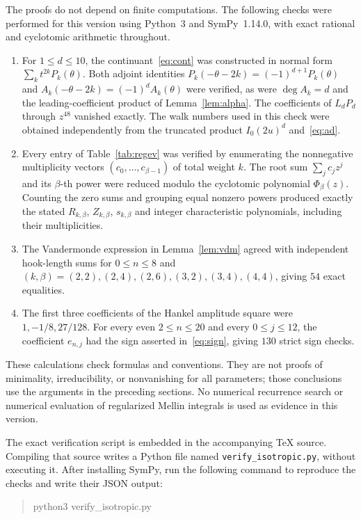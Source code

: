 \documentclass[11pt]{amsart}
\theoremstyle{definition}
\begin{document}
The proofs do not depend on finite computations. The following checks were
performed for this version using Python~3 and SymPy~1.14.0, with exact rational
and cyclotomic arithmetic throughout.

\begin{enumerate}[label=\textup{(\roman*)}]
\item For $1\le d\le10$, the continuant~\eqref{eq:cont} was constructed in
normal form $\sum_k t^{2k}P_k(\theta)$. Both adjoint identities
$P_k(-\theta-2k)=(-1)^{d+1}P_k(\theta)$ and
$A_k(-\theta-2k)=(-1)^dA_k(\theta)$ were verified, as were
$\deg A_k=d$ and the leading-coefficient product of
Lemma~\ref{lem:alpha}. The coefficients of $L_dP_d$ through $z^{48}$
vanished exactly. The walk numbers used in this check were obtained
independently from the truncated product
$I_0(2u)^d$ and~\eqref{eq:ad}.
\item Every entry of Table~\ref{tab:regev} was verified by enumerating
the nonnegative multiplicity vectors $(c_0,\ldots,c_{\beta-1})$ of total
weight $k$. The root sum $\sum_jc_jz^j$ and its $\beta$-th power were
reduced modulo the cyclotomic polynomial $\Phi_\beta(z)$. Counting the
zero sums and grouping equal nonzero powers produced exactly the stated
$R_{k,\beta}$, $Z_{k,\beta}$, $s_{k,\beta}$ and integer characteristic
polynomials, including their multiplicities.
\item The Vandermonde expression in Lemma~\ref{lem:vdm} agreed with
independent hook-length sums for $0\le n\le8$ and
$(k,\beta)=(2,2),(2,4),(2,6),(3,2),(3,4),(4,4)$, giving
$54$ exact equalities.
\item The first three coefficients of the Hankel amplitude square were
$1,-1/8,27/128$. For every even $2\le n\le20$ and every $0\le j\le12$,
the coefficient $e_{n,j}$ had the sign asserted in~\eqref{eq:sign},
giving $130$ strict sign checks.
\end{enumerate}

These calculations check formulas and conventions. They are not proofs
of minimality, irreducibility, or nonvanishing for all parameters; those
conclusions use the arguments in the preceding sections. No numerical
recurrence search or numerical evaluation of regularized Mellin integrals
is used as evidence in this version.

The exact verification script is embedded in the accompanying TeX source.
Compiling that source writes a Python file named
\texttt{verify\_isotropic.py}, without executing it.
After installing SymPy, run the following command to reproduce the checks
and write their JSON output:
\begin{quote}\small\ttfamily
python3 verify\_isotropic.py
\end{quote}
\end{document}
